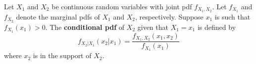 \begin{definition}
	Let $X_1$ and $X_2$ be continuous random variables with joint pdf $f_{X_1,X_2}$. Let $f_{X_1}$ and $f_{X_2}$ denote the marginal pdfs of $X_1$ and $X_2$, respectively. Suppose $x_1$ is such that $f_{X_1}(x_1)>0$. The \textbf{conditional pdf} of $X_2$ given that $X_1=x_1$ is defined by
	$$f_{X_2|X_1}(x_2|x_1)=\frac{f_{X_1,X_2}(x_1,x_2)}{f_{X_1}(x_1)}$$
	where $x_2$ is in the support of $X_2$.
\end{definition}

